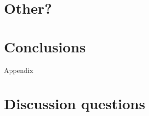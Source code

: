 \documentclass[12pt]{article}
\begin{document}
\section{Other?}
\label{sec:other}




\section{Conclusions}
\label{sec:conclusions}

Appendix

\appendix

\section{Discussion questions}
\label{sec:discussion_questions}
\end{document}
